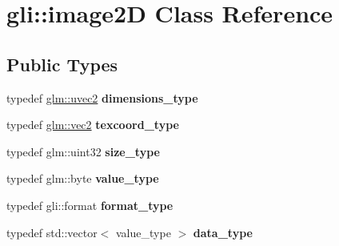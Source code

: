 \hypertarget{classgli_1_1image2D}{\section{gli\-:\-:image2\-D \-Class \-Reference}
\label{classgli_1_1image2D}
}
\subsection*{\-Public \-Types}
\begin{DoxyCompactItemize}
\item 
\hypertarget{classgli_1_1image2D_a5b5e07fea1a11b3fa8ef5eed8362f291}{typedef \hyperlink{group__core__types_gad0643cb47b927024ccf4979b0e9a903d}{glm\-::uvec2} {\bfseries dimensions\-\_\-type}}\label{classgli_1_1image2D_a5b5e07fea1a11b3fa8ef5eed8362f291}

\item 
\hypertarget{classgli_1_1image2D_a9808ac1906d401a2ff6832ef4dd7363e}{typedef \hyperlink{group__core__types_ga66d091b759687504ab01365fbd33a1dd}{glm\-::vec2} {\bfseries texcoord\-\_\-type}}\label{classgli_1_1image2D_a9808ac1906d401a2ff6832ef4dd7363e}

\item 
\hypertarget{classgli_1_1image2D_ab79fd7e656c3bef3e16c15d0d865539c}{typedef glm\-::uint32 {\bfseries size\-\_\-type}}\label{classgli_1_1image2D_ab79fd7e656c3bef3e16c15d0d865539c}

\item 
\hypertarget{classgli_1_1image2D_a3b879d13e6d1f84af0db36eab4d9def3}{typedef glm\-::byte {\bfseries value\-\_\-type}}\label{classgli_1_1image2D_a3b879d13e6d1f84af0db36eab4d9def3}

\item 
\hypertarget{classgli_1_1image2D_a86e39c03372de097ba771684214f1d6a}{typedef gli\-::format {\bfseries format\-\_\-type}}\label{classgli_1_1image2D_a86e39c03372de097ba771684214f1d6a}

\item 
\hypertarget{classgli_1_1image2D_aff505a463fc554cea686c776dda9a3a4}{typedef std\-::vector$<$ value\-\_\-type $>$ {\bfseries data\-\_\-type}}\label{classgli_1_1image2D_aff505a463fc554cea686c776dda9a3a4}

\end{DoxyCompactItemize}
